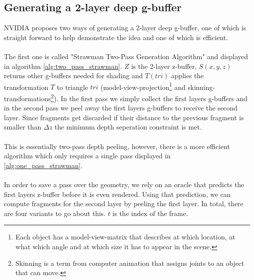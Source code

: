 \documentclass{ACGSeminar}
\begin{document}
	\subsection{Generating a 2-layer deep g-buffer}
		NVIDIA proposes two ways of generating a 2-layer deep g-buffer, one of which is straight forward to help demonstrate the idea and one of which is efficient. \\\\
		The first one is called "Strawman Two-Pass Generation Algorithm" and displayed in algorithm \ref{alg:two_pass_strawman}. $Z$ is the 2-layer z-buffer, $S(x, y, z)$ returns other g-buffers needed for shading and $T(tri)$ applies the transformation $T$ to triangle $tri$ (model-view-projection\footnote{Each object has a model-view-matrix that describes at which location, at what which angle and at which size it has to appear in the scene.} and skinning-transformations\footnote{Skinning is a term from computer animation that assigns joints to an object that can move.}). In the first pass we simply collect the first layers g-buffers and in the second pass we peel away the first layers g-buffers to receive the second layer. Since fragments get discarded if their distance to the previous fragment is smaller than $\Delta z$ the minimum depth seperation constraint is met. \\\\
		This is essentially two-pass depth peeling, however, there is a more efficient algorithm which only requires a single pass displayed in \ref{alg:one_pass_strawman}. \\\\
		In order to save a pass over the geometry, we rely on an oracle that predicts the first layers z-buffer before it is even rendered. Using that prediction, we can compute fragments for the second layer by peeling the first layer. In total, there are four variants to go about this. $t$ is the index of the frame.
\end{document}
